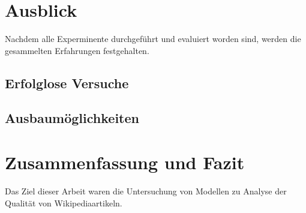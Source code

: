 \documentclass[researchlab,palatino]{AIGpaper}
\begin{document}
\section{Ausblick}
Nachdem alle Experminente durchgeführt und evaluiert worden sind, werden die gesammelten Erfahrungen festgehalten.

\subsection{Erfolglose Versuche}

\subsection{Ausbaumöglichkeiten}

\section{Zusammenfassung und Fazit}
Das Ziel dieser Arbeit waren die Untersuchung von Modellen zu Analyse der Qualität von Wikipediaartikeln.
\addreferences

\end{document}
